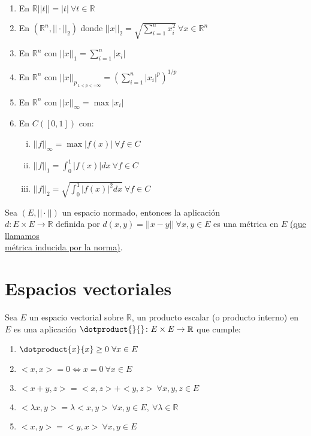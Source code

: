 	\begin{ejem} \ 
		\begin{enumerate}[1)]
			\item En $\mathbb{R} ||t||=|t| \ \forall t\in \mathbb{R}$
			\item En $(\mathbb{R}^n,||\cdot||_2)$ donde $||x||_2 =\sqrt{\sum^n_{i=1}x_i^2}\ \forall x \in \mathbb{R}^n$
			\item En $\mathbb{R}^n$ con $||x||_1 =\sum ^n_{i=1}|x_i|$
			\item En $\mathbb{R}^n$ con $||x||_{p_{\ 1<p<+\infty}} =(\sum ^n_{i=1}|x_i|^p)^{1/p}$
			\item En $\mathbb{R}^n$ con $||x||_\infty = \max|x_i|$
			\item En $C([0,1])$ con: 
				\begin{enumerate}[i)]
					\item $||f||_\infty = \max|f(x)| \ \forall f \in C$
					\item $||f||_1 = \int_0^1  |f(x)|dx\ \forall f \in C$
					\item $||f||_2 = \sqrt{\int_0^1  |f(x)|^2dx}\ \forall f \in C$
				\end{enumerate}
		\end{enumerate}		
	\end{ejem}
	
	
	
	\begin{proposicion}
	 Sea $(E,||\cdot||)$ un espacio normado, entonces la aplicación \\
	 $d\colon E\times E \to \mathbb{R}$ definida por $d(x,y)= ||x-y|| \ \forall	x,y \in E$ es una m\'etrica en $E$ \underline{(que llamamos}\\ \underline{ m\'etrica inducida por la norma)}.
	 \end{proposicion}
	
	\section{Espacios vectoriales}	
	
	\begin{defi}
		Sea $E$ un espacio vectorial sobre $\mathbb{R}$, un producto escalar (o producto interno) en $E$ es una aplicaci\'on $\dotproduct{}{}\colon E\times E \to \mathbb{R}$ que cumple:
		\begin{enumerate}[1)]
			\item $\dotproduct{x}{x}\geq 0 \ \forall x\in E$
			\item $<x,x>=0 \Leftrightarrow x=0 \ \forall x \in E$
			\item $<x+y,z>=<x,z>+<y,z> \ \forall x,y,z \in E$
			\item $<\lambda x,y>= \lambda <x,y> \ \forall x,y \in E, \ \forall \lambda \in \mathbb{R}$
			\item $<x,y> = <y,x> \ \forall x,y \in E$
		\end{enumerate}
	\end{defi}
	 

